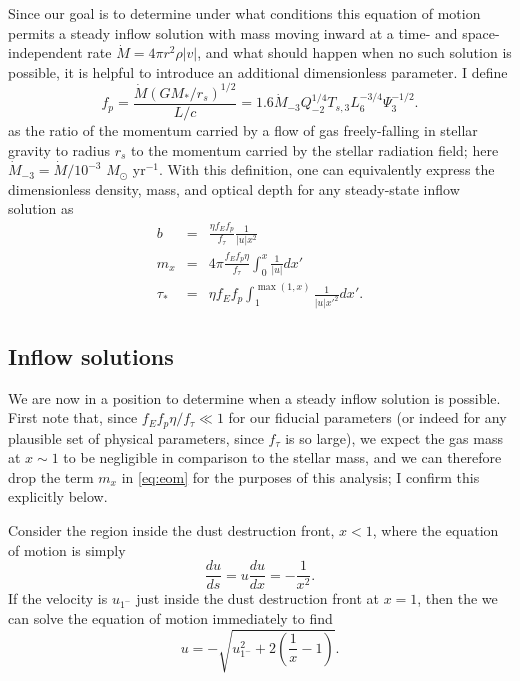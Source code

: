 \documentclass[useAMS,usenatbib]{mn2e}
\begin{document}
Since our goal is to determine under what conditions this equation of motion permits a steady inflow solution with mass moving inward at a time- and space-independent rate $\dot{M} = 4\pi r^2 \rho |v|$, and what should happen when no such solution is possible, it is helpful to introduce an additional dimensionless parameter. I define
\begin{equation}
f_p = \frac{\dot{M} (GM_*/r_s)^{1/2}}{L/c} = 1.6 \dot{M}_{-3} Q_{-2}^{1/4} T_{s,3} L_6^{-3/4} \Psi_3^{-1/2}.
\end{equation}
as the ratio of the momentum carried by a flow of gas freely-falling in stellar gravity to radius $r_s$ to the momentum carried by the stellar radiation field; here $\dot{M}_{-3} = \dot{M}/10^{-3}$ $M_\odot$ yr$^{-1}$. With this definition, one can equivalently express the dimensionless density, mass, and optical depth for any steady-state inflow solution as
\begin{eqnarray}
\label{eq:density}
b & = & \frac{\eta f_E f_p}{f_\tau} \frac{1}{|u| x^2} \\
\label{eq:mx}
m_x & = & 4\pi \frac{f_E f_p \eta}{f_\tau} \int_0^x \frac{1}{|u|} dx' \\
\tau_* & = & \eta f_E f_p \int_1^{\max(1,x)} \frac{1}{|u| x'^2} dx'.
\label{eq:tau_star}
\end{eqnarray}


\subsection{Inflow solutions}
\label{ssec:inflow_sol}

We are now in a position to determine when a steady inflow solution is possible. First note that, since $f_E f_p \eta/f_\tau \ll 1$ for our fiducial parameters (or indeed for any plausible set of physical parameters, since $f_\tau$ is so large), we expect the gas mass at $x\sim 1$ to be negligible in comparison to the stellar mass, and we can therefore drop the term $m_x$ in \autoref{eq:eom} for the purposes of this analysis; I confirm this explicitly below.

Consider the region inside the dust destruction front, $x<1$, where the equation of motion is simply
\begin{equation}
\frac{du}{ds} = u\frac{du}{dx} = -\frac{1}{x^2}.
\end{equation}
If the velocity is $u_{1^-}$ just inside the dust destruction front at $x=1$, then the we can solve the equation of motion immediately to find
\begin{equation}
\label{eq:u_UV}
u = - \sqrt{u_{1^-}^2 + 2\left(\frac{1}{x}-1\right)}.
\end{equation}
\end{document}

